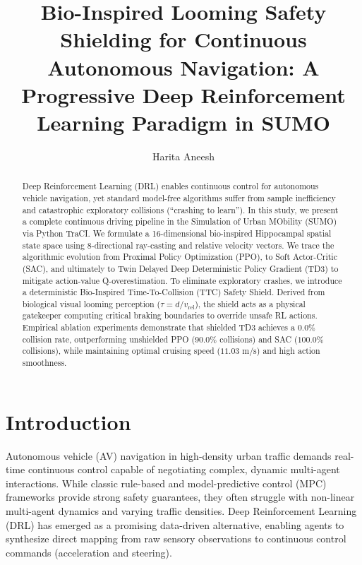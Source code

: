 \documentclass{svproc}
\begin{document}
\mainmatter

\title{Bio-Inspired Looming Safety Shielding for Continuous Autonomous Navigation: A Progressive Deep Reinforcement Learning Paradigm in SUMO}


\author{Harita Aneesh}




\maketitle

\begin{abstract}
Deep Reinforcement Learning (DRL) enables continuous control for autonomous vehicle navigation, yet standard model-free algorithms suffer from sample inefficiency and catastrophic exploratory collisions (``crashing to learn''). In this study, we present a complete continuous driving pipeline in the Simulation of Urban MObility (SUMO) via Python TraCI. We formulate a 16-dimensional bio-inspired Hippocampal spatial state space using 8-directional ray-casting and relative velocity vectors. We trace the algorithmic evolution from Proximal Policy Optimization (PPO), to Soft Actor-Critic (SAC), and ultimately to Twin Delayed Deep Deterministic Policy Gradient (TD3) to mitigate action-value Q-overestimation. To eliminate exploratory crashes, we introduce a deterministic Bio-Inspired Time-To-Collision (TTC) Safety Shield. Derived from biological visual looming perception ($\tau = d / v_{\text{rel}}$), the shield acts as a physical gatekeeper computing critical braking boundaries to override unsafe RL actions. Empirical ablation experiments demonstrate that shielded TD3 achieves a $0.0\%$ collision rate, outperforming unshielded PPO ($90.0\%$ collisions) and SAC ($100.0\%$ collisions), while maintaining optimal cruising speed ($11.03\text{ m/s}$) and high action smoothness.

\end{abstract}

\section{Introduction}\label{sec:intro}
Autonomous vehicle (AV) navigation in high-density urban traffic demands real-time continuous control capable of negotiating complex, dynamic multi-agent interactions. While classic rule-based and model-predictive control (MPC) frameworks provide strong safety guarantees, they often struggle with non-linear multi-agent dynamics and varying traffic densities. Deep Reinforcement Learning (DRL) has emerged as a promising data-driven alternative, enabling agents to synthesize direct mapping from raw sensory observations to continuous control commands (acceleration and steering).
\end{document}
